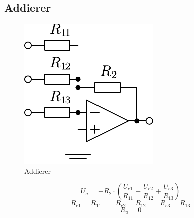 



\subsection{Addierer}
\begin{figure}[h!]
	\centering
	\includegraphics[scale=\schscale]{op_add.pdf}
	\caption{Addierer}
	\label{sch:op-add}
\end{figure}
\[ U_a = - R_2 \cdot \left( \frac{U_{e1}}{R_{11}} + \frac{U_{e2}}{R_{12}} 
+ \frac{U_{e3}}{R_{13}} \right) \]
\[ R_{e1} = R_{11} \qquad R_{e2} = R_{12} \qquad R_{e3} = R_{13} \]
\[ R_a = 0 \]